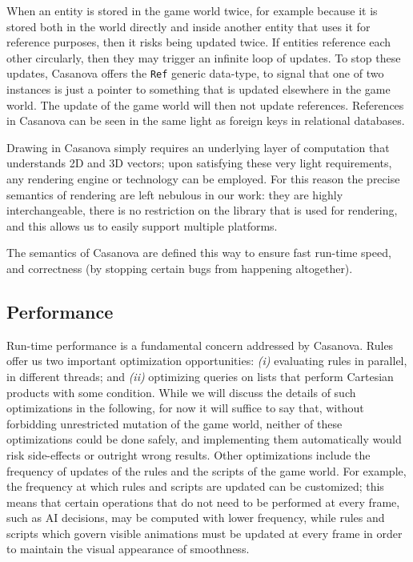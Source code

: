 When an entity is stored in the game world twice, for example because it is stored both in the world directly and inside another entity that uses it for reference purposes, then it risks being updated twice. If entities reference each other circularly, then they may trigger an infinite loop of updates. To stop these updates, Casanova offers the \texttt{Ref} generic data-type, to signal that one of two instances is just a pointer to something that is updated elsewhere in the game world. The update of the game world will then not update references. References in Casanova can be seen in the same light as foreign keys in relational databases.

Drawing in Casanova simply requires an underlying layer of computation that understands 2D and 3D vectors; upon satisfying these very light requirements, any rendering engine or technology can be employed. For this reason the precise semantics of rendering are left nebulous in our work: they are highly interchangeable, there is no restriction on the library that is used for rendering, and this allows us to easily support multiple platforms.

The semantics of Casanova are defined this way to ensure fast run-time speed, and correctness (by stopping certain bugs from happening altogether).

\subsection{Performance}
Run-time performance is a fundamental concern addressed by Casanova. Rules offer us two important optimization opportunities: \textit{(i)} evaluating rules in parallel, in different threads; and \textit{(ii)} optimizing queries on lists that perform Cartesian products with some condition. While we will discuss the details of such optimizations in the following, for now it will suffice to say that, without forbidding unrestricted mutation of the game world, neither of these optimizations could be done safely, and implementing them automatically would risk side-effects or outright wrong results. Other optimizations include the frequency of updates of the rules and the scripts of the game world. For example, the frequency at which rules and scripts are updated can be customized; this means that certain operations that do not need to be performed at every frame, such as AI decisions, may be computed with lower frequency, while rules and scripts which govern visible animations must be updated at every frame in order to maintain the visual appearance of smoothness.

